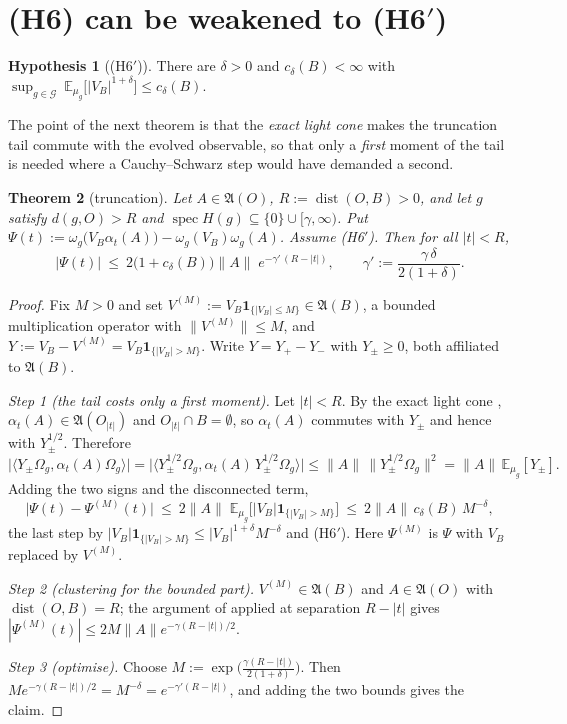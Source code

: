 \documentclass[11pt,a4paper]{article}
\theoremstyle{plain}
\newtheorem{theorem}{Theorem}[section]
\theoremstyle{definition}
\newtheorem{hypothesis}[theorem]{Hypothesis}
\newcommand{\A}{\mathfrak{A}}
\newcommand{\Om}{\Omega}
\newcommand{\ip}[2]{\langle #1,#2\rangle}
\DeclareMathOperator{\dist}{dist}
\DeclareMathOperator{\spec}{spec}
\begin{document}
\section{(H6) can be weakened to (H6$'$)}\label{sec:trunc}

\begin{hypothesis}[(H6$'$)]\label{hyp:H6p}
There are $\delta>0$ and $c_\delta(B)<\infty$ with
$\displaystyle\sup_{g\in\mathcal G}\ \mathbb E_{\mu_g}\bigl[|V_B|^{1+\delta}\bigr]\le c_\delta(B)$.
\end{hypothesis}

The point of the next theorem is that the \emph{exact light cone} makes the truncation tail
commute with the evolved observable, so that only a \emph{first} moment of the tail is needed
where a Cauchy--Schwarz step would have demanded a second.

\begin{theorem}[truncation]\label{thm:trunc}
Let $A\in\A(O)$, $R:=\dist(O,B)>0$, and let $g$ satisfy $d(g,O)>R$ and
$\spec H(g)\subseteq\{0\}\cup[\gamma,\infty)$. Put
$\Psi(t):=\omega_g\bigl(V_B\alpha_t(A)\bigr)-\omega_g(V_B)\omega_g(A)$. Assume (H6$'$). Then for
all $|t|<R$,
\[
  |\Psi(t)|\ \le\ 2\bigl(1+c_\delta(B)\bigr)\|A\|\;e^{-\gamma'\,(R-|t|)},
  \qquad \gamma':=\frac{\gamma\,\delta}{2(1+\delta)} .
\]
\end{theorem}

\begin{proof}
Fix $M>0$ and set $V^{(M)}:=V_B\mathbf 1_{\{|V_B|\le M\}}\in\A(B)$, a bounded multiplication
operator with $\|V^{(M)}\|\le M$, and $Y:=V_B-V^{(M)}=V_B\mathbf 1_{\{|V_B|>M\}}$. Write
$Y=Y_+-Y_-$ with $Y_\pm\ge0$, both affiliated to $\A(B)$.

\emph{Step 1 (the tail costs only a first moment).} Let $|t|<R$. By the exact light cone
\cite[Fact~1.3(i)]{M0}, $\alpha_t(A)\in\A(O_{|t|})$ and $O_{|t|}\cap B=\emptyset$, so
$\alpha_t(A)$ commutes with $Y_\pm$ and hence with $Y_\pm^{1/2}$. Therefore
\[
  \bigl|\ip{Y_\pm\Om_g}{\alpha_t(A)\Om_g}\bigr|
  =\bigl|\ip{Y_\pm^{1/2}\Om_g}{\alpha_t(A)\,Y_\pm^{1/2}\Om_g}\bigr|
  \le\|A\|\,\bigl\|Y_\pm^{1/2}\Om_g\bigr\|^2=\|A\|\,\mathbb E_{\mu_g}[Y_\pm].
\]
Adding the two signs and the disconnected term,
\[
  \bigl|\Psi(t)-\Psi^{(M)}(t)\bigr|\ \le\ 2\|A\|\;\mathbb E_{\mu_g}\bigl[|V_B|\mathbf 1_{\{|V_B|>M\}}\bigr]
  \ \le\ 2\|A\|\,c_\delta(B)\,M^{-\delta},
\]
the last step by $|V_B|\mathbf 1_{\{|V_B|>M\}}\le|V_B|^{1+\delta}M^{-\delta}$ and (H6$'$). Here
$\Psi^{(M)}$ is $\Psi$ with $V_B$ replaced by $V^{(M)}$.

\emph{Step 2 (clustering for the bounded part).} $V^{(M)}\in\A(B)$ and $A\in\A(O)$ with
$\dist(O,B)=R$; the argument of \cite[Thm.~2.3]{M3} applied at separation $R-|t|$ gives
$|\Psi^{(M)}(t)|\le2M\|A\|e^{-\gamma(R-|t|)/2}$.

\emph{Step 3 (optimise).} Choose $M:=\exp\bigl(\tfrac{\gamma(R-|t|)}{2(1+\delta)}\bigr)$. Then
$Me^{-\gamma(R-|t|)/2}=M^{-\delta}=e^{-\gamma'(R-|t|)}$, and adding the two bounds gives the claim.
\end{proof}
\end{document}

